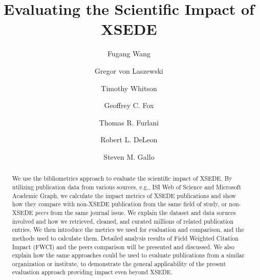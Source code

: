 \documentclass[sigconf]{acmart}
\newcommand{\TITLE}{Evaluating the Scientific Impact of XSEDE}
\begin{document}

\title{\TITLE}

\author{Fugang Wang}

\author{Gregor von Laszewski}

\author{Timothy Whitson}

\author{Geoffrey C. Fox}

\author{Thomas R. Furlani}

\author{Robert L. DeLeon}

\author{Steven M. Gallo}

\renewcommand{\shortauthors}{F. Wang et al.}

\begin{abstract}

  We use the bibliometrics approach to evaluate the scientific impact of
  XSEDE. By utilizing publication data from various sources, e.g.,
  ISI Web of Science and Microsoft Academic Graph, we calculate the
  impact metrics of XSEDE publications and show how they compare with
  non-XSEDE publication from the same field of study, or non-XSEDE
  \emph{peers} from the same journal issue. We explain the dataset and
  data soruces involved and how
  we retrieved, cleaned, and curated millions of related publication
  entries.  We then introduce the metrics we used for evaluation and
  comparison, and the methods used to calculate them. Detailed
  analysis results of Field Weighted Citation Impact (FWCI) and the
  peers comparison will be presented and discussed. We also explain
  how the same approaches could be used to evaluate publications from
  a similar organization or institute, to demonstrate the general
  applicability of the present evaluation approach providing impact
  even beyond XSEDE.

\end{abstract}
\end{document}
